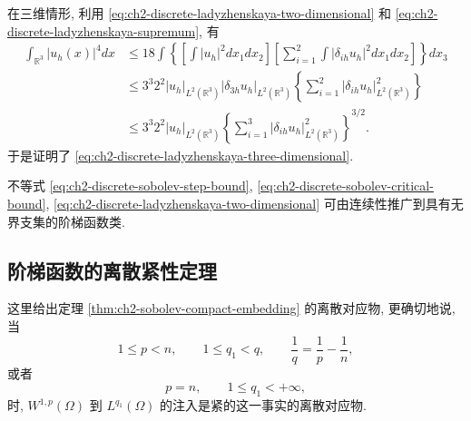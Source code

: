 \begin{Proof}
在三维情形, 利用 \eqref{eq:ch2-discrete-ladyzhenskaya-two-dimensional} 和 \eqref{eq:ch2-discrete-ladyzhenskaya-supremum}, 有
\begin{equation}
\begin{aligned}
\int_{\mathbb R^3}|u_h(x)|^4dx
&\leq18\int\left\{\left[\int|u_h|^2dx_1dx_2\right]
\left[\sum_{i=1}^{2}\int|\delta_{ih}u_h|^2dx_1dx_2\right]\right\}dx_3\\
&\leq3^3 2^2|u_h|_{L^2(\mathbb R^3)}
|\delta_{3h}u_h|_{L^2(\mathbb R^3)}
\left\{\sum_{i=1}^{2}|\delta_{ih}u_h|_{L^2(\mathbb R^3)}^2\right\}\\
&\leq3^3 2^2|u_h|_{L^2(\mathbb R^3)}
\left\{\sum_{i=1}^{3}|\delta_{ih}u_h|_{L^2(\mathbb R^3)}^2\right\}^{3/2}.
\end{aligned}
\label{eq:ch2-discrete-ladyzhenskaya-three-dimensional-proof}
\end{equation}
于是证明了 \eqref{eq:ch2-discrete-ladyzhenskaya-three-dimensional}.
\end{Proof}

\hypertarget{chapter-02-page-141}{}
\begin{Remark}
\label{rem:ch2-step-inequalities-unbounded-support}
不等式 \eqref{eq:ch2-discrete-sobolev-step-bound}, \eqref{eq:ch2-discrete-sobolev-critical-bound}, \eqref{eq:ch2-discrete-ladyzhenskaya-two-dimensional} 可由连续性推广到具有无界支集的阶梯函数类.
\end{Remark}

\subsection{阶梯函数的离散紧性定理}
\label{subsec:ch2-discrete-compactness-step-functions}

这里给出定理 \ref{thm:ch2-sobolev-compact-embedding} 的离散对应物, 更确切地说, 当
\begin{equation}
1\leq p<n,
\qquad1\leq q_1<q,
\qquad\frac1q=\frac1p-\frac1n,
\label{eq:ch2-step-compactness-exponents-subcritical}
\end{equation}
或者
\begin{equation}
p=n,
\qquad1\leq q_1<+\infty,
\label{eq:ch2-step-compactness-exponents-critical}
\end{equation}
时, $W^{1,p}(\Omega)$ 到 $L^{q_1}(\Omega)$ 的注入是紧的这一事实的离散对应物.

